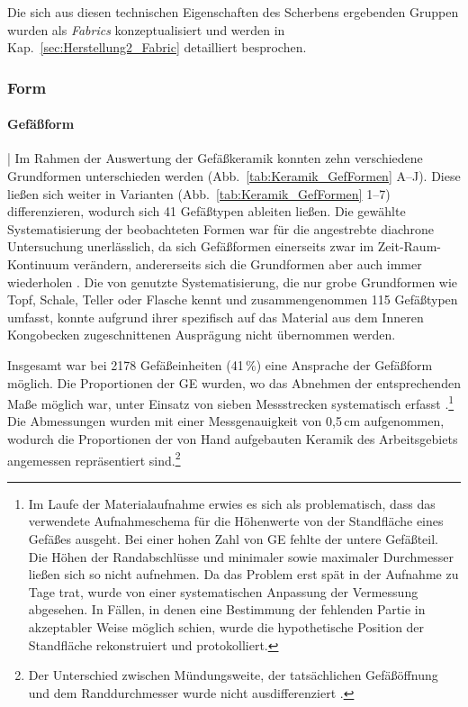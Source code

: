 \begin{multicols}{2}
Die sich aus diesen technischen Eigenschaften des Scherbens ergebenden Gruppen wurden als \textit{Fabrics} konzeptualisiert und werden in Kap.~\ref{sec:Herstellung2_Fabric} detailliert besprochen.

\subsubsection{Form}

\paragraph{Gefäßform}\hspace{-.5em}|\hspace{.5em}%
Im Rahmen der Auswertung der Gefäßkeramik konnten zehn verschiedene Grundformen unterschieden werden (Abb.~\ref{tab:Keramik_GefFormen} A--J). Diese ließen sich weiter in Varianten (Abb.~\ref{tab:Keramik_GefFormen} 1--7) differenzieren, wodurch sich 41 Gefäßtypen ableiten ließen. Die gewählte Systematisierung der beobachteten Formen war für die angestrebte diachrone Untersuchung unerlässlich, da sich Gefäßformen einerseits zwar im Zeit-Raum-Kontinuum verändern, andererseits sich die Grundformen aber auch immer wiederholen \parencite[86]{Saev.2015}. Die von \textcite[39\, f.]{Wotzka.1995} genutzte Systematisierung, die nur grobe Grundformen wie Topf, Schale, Teller oder Flasche kennt und zusammengenommen 115 Gefäßtypen umfasst, konnte aufgrund ihrer spezifisch auf das Material aus dem Inneren Kongobecken zugeschnittenen Ausprägung nicht übernommen werden.\columnbreak

Insgesamt war bei 2178 Gefäßeinheiten (41\,\%) eine Ansprache der Gefäßform möglich. Die Proportionen der GE wurden, wo das Abnehmen der entsprechenden Maße möglich war, unter Einsatz von sieben Messstrecken systematisch erfasst \parencite[Abb.~\ref{fig:GefAbmessungen_Schema}; siehe][]{Wicke.2011}.\footnote{Im Laufe der Materialaufnahme erwies es sich als problematisch, dass das verwendete Aufnahmeschema für die Höhenwerte von der Standfläche eines Gefäßes ausgeht. Bei einer hohen Zahl von GE fehlte der untere Gefäßteil. Die Höhen der Randabschlüsse und minimaler sowie maximaler Durchmesser ließen sich so nicht aufnehmen. Da das Problem erst spät in der Aufnahme zu Tage trat, wurde von einer systematischen Anpassung der Vermessung abgesehen. In Fällen, in denen eine Bestimmung der fehlenden Partie in akzeptabler Weise möglich schien, wurde die hypothetische Position der Standfläche rekonstruiert und protokolliert.} Die Abmessungen wurden mit einer Messgenauigkeit von 0,5\,cm aufgenommen, wodurch die Proportionen der von Hand aufgebauten Keramik des Arbeitsgebiets angemessen repräsentiert sind.\footnote{Der Unterschied zwischen Mündungsweite, der tatsächlichen Gefäßöffnung und dem Randdurchmesser wurde nicht ausdifferenziert \parencite[siehe][88]{Saev.2015}.}


\end{multicols}
